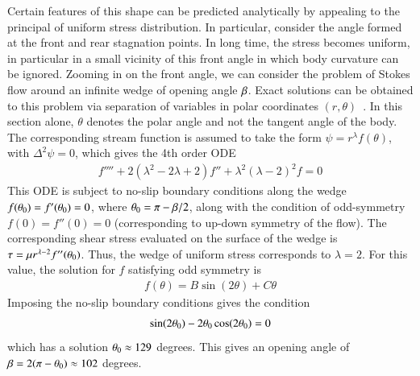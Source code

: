 \documentclass[preprint, 10pt]{elsarticle}
\begin{document}
Certain features of this shape can be predicted analytically by
appealing to the principal of uniform stress distribution. In
particular, consider the angle formed at the front and rear stagnation
points. In long time, the stress becomes uniform, in particular in a
small vicinity of this front angle in which body curvature can be
ignored. Zooming in on the front angle, we can consider the problem of
Stokes flow around an infinite wedge of opening angle $\beta$. Exact
solutions can be obtained to this problem via separation of variables in
polar coordinates $(r, \theta)$~\cite{poz1997}. In this section alone,
$\theta$ denotes the polar angle and not the tangent angle of the body.
The corresponding stream function is assumed to take the form $\psi =
r^{\lambda}f(\theta)$, with $\Delta^2 \psi = 0$, which gives the 4th
order ODE~\cite{poz1997}
\begin{align*}
  f'''' + 2(\lambda^2 - 2 \lambda + 2)f'' + \lambda^2(\lambda-2)^2 f = 0
\end{align*}
This ODE is subject to no-slip boundary conditions along the wedge
$f(\theta_0) = f'(\theta_0) = 0$, where $\theta_0 = \pi - \beta/2$, along with the
condition of odd-symmetry $f(0) = f''(0) = 0$ (corresponding to up-down
symmetry of the flow).  The corresponding shear stress evaluated on the
surface of the wedge is $\tau = \mu r^{\lambda-2} f''(\theta_0)$. Thus, the
wedge of uniform stress corresponds to $\lambda = 2$. For this value,
the solution for $f$ satisfying odd symmetry is
\begin{align*}
  f(\theta) = B \sin (2 \theta) + C \theta
\end{align*}
Imposing the no-slip boundary conditions gives the condition
\begin{align*}
  \sin(2 \theta_0) - 2 \theta_0 \cos(2 \theta_0) = 0
\end{align*}
which has a solution $\theta_0 \approx 129$ degrees. This gives an opening
angle of $\beta = 2(\pi - \theta_0) \approx 102$ degrees.
\end{document}
